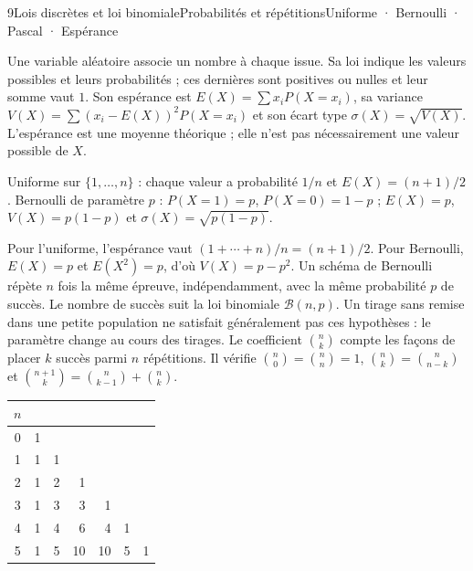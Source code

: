 \begin{ouverture}[binomiale]{9}{Lois discrètes et loi binomiale}{Probabilités et répétitions}{Uniforme · Bernoulli · Pascal · Espérance}
\end{ouverture}
\essentiel

Une variable aléatoire associe un nombre à chaque issue. Sa loi indique les valeurs possibles et leurs probabilités ; ces dernières sont positives ou nulles et leur somme vaut $1$.
Son espérance est $E(X)=\sum x_iP(X=x_i)$, sa variance $V(X)=\sum(x_i-E(X))^2P(X=x_i)$ et son écart type $\sigma(X)=\sqrt{V(X)}$.
L'espérance est une moyenne théorique ; elle n'est pas nécessairement une valeur possible de $X$.
\begin{definition}
Uniforme sur $\{1,\ldots,n\}$ : chaque valeur a probabilité $1/n$ et $E(X)=(n+1)/2$.
Bernoulli de paramètre $p$ : $P(X=1)=p$, $P(X=0)=1-p$ ;
$E(X)=p$, $V(X)=p(1-p)$ et $\sigma(X)=\sqrt{p(1-p)}$.
\end{definition}
Pour l'uniforme, l'espérance vaut $(1+\cdots+n)/n=(n+1)/2$.
Pour Bernoulli, $E(X)=p$ et $E(X^2)=p$, d'où $V(X)=p-p^2$.
Un schéma de Bernoulli répète $n$ fois la même épreuve, indépendamment, avec la même probabilité $p$ de succès. Le nombre de succès suit la loi binomiale $\mathcal B(n,p)$.
Un tirage sans remise dans une petite population ne satisfait généralement pas ces hypothèses : le paramètre change au cours des tirages.
Le coefficient $\binom nk$ compte les façons de placer $k$ succès parmi $n$ répétitions. Il vérifie $\binom n0=\binom nn=1$, $\binom nk=\binom n{n-k}$ et
$\binom{n+1}k=\binom n{k-1}+\binom nk$.
\begin{center}\begin{tabular}{c|rrrrrr}$n$&&&&&&\\\hline
0&1\\1&1&1\\2&1&2&1\\3&1&3&3&1\\4&1&4&6&4&1\\5&1&5&10&10&5&1\end{tabular}\end{center}
